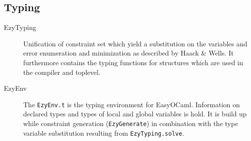 \subsection{Typing}
\label{hd005007}
\begin{description}
    \item[EzyTyping] Unification of constraint set which yield a 
        substitution on the variables and error enumeration and 
        minimization as described by Haack \& Wells.  It furthermore 
        contains the typing functions for structures which are used in 
        the compiler and toplevel.
    \item[EzyEnv] The \texttt{EzyEnv.t} is the typing environment 
        for EasyOCaml. Information on declared types and types of local 
        and global variables is hold.  It is build up while constraint 
        generation (\texttt{EzyGenerate}) in combination with the type 
        variable substitution resulting from \texttt{EzyTyping.solve}.
\end{description}

